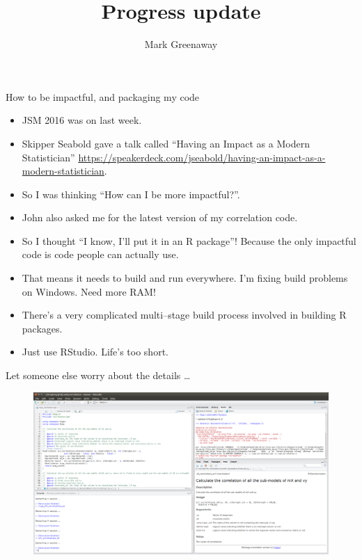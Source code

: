 \documentclass{beamer}
\title{Progress update}
\author{Mark Greenaway}
\begin{document}
\begin{frame}
\titlepage
\end{frame}

\begin{frame}{How to be impactful, and packaging my code}
\begin{itemize}
\item JSM 2016 was on last week.
\item Skipper Seabold gave a talk called ``Having an Impact as a Modern Statistician'' \url{https://speakerdeck.com/jseabold/having-an-impact-as-a-modern-statistician}.
\item So I was thinking ``How can I be more impactful?''.
\item John also asked me for the latest version of my correlation code.
\item So I thought ``I know, I'll put it in an R package''! Because the only impactful code is code people can
actually use.
\item That means it needs to build and run everywhere. I'm fixing build problems on Windows. Need more RAM!
\item There's a very complicated multi--stage build process involved in building R packages.
\item Just use RStudio. Life's too short.
\end{itemize}
\end{frame}

\begin{frame}{Let someone else worry about the details \ldots}
\begin{figure}
\includegraphics[scale=0.2]{Screenshot_of_R_package_development.png}
\end{figure}
\end{frame}
\end{document}
